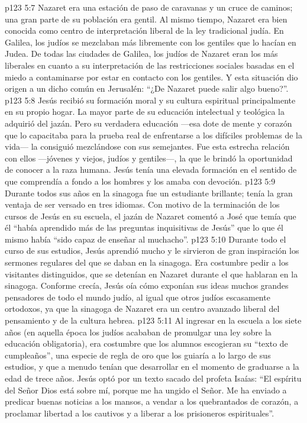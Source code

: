 \vs p123 5:7 Nazaret era una estación de paso de caravanas y un cruce de caminos; una gran parte de su población era gentil. Al mismo tiempo, Nazaret era bien conocida como centro de interpretación liberal de la ley tradicional judía. En Galilea, los judíos se mezclaban más libremente con los gentiles que lo hacían en Judea. De todas las ciudades de Galilea, los judíos de Nazaret eran los más liberales en cuanto a su interpretación de las restricciones sociales basadas en el miedo a contaminarse por estar en contacto con los gentiles. Y esta situación dio origen a un dicho común en Jerusalén: “¿De Nazaret puede salir algo bueno?”.
\vs p123 5:8 Jesús recibió su formación moral y su cultura espiritual principalmente en su propio hogar. La mayor parte de su educación intelectual y teológica la adquirió del jazán. Pero su verdadera educación ---esa dote de mente y corazón que lo capacitaba para la prueba real de enfrentarse a los difíciles problemas de la vida--- la consiguió mezclándose con sus semejantes. Fue esta estrecha relación con ellos ---jóvenes y viejos, judíos y gentiles---, la que le brindó la oportunidad de conocer a la raza humana. Jesús tenía una elevada formación en el sentido de que comprendía a fondo a los hombres y los amaba con devoción.
\vs p123 5:9 \pc Durante todos sus años en la sinagoga fue un estudiante brillante; tenía la gran ventaja de ser versado en tres idiomas. Con motivo de la terminación de los cursos de Jesús en su escuela, el jazán de Nazaret comentó a José que temía que él “había aprendido más de las preguntas inquisitivas de Jesús” que lo que él mismo había “sido capaz de enseñar al muchacho”.
\vs p123 5:10 Durante todo el curso de sus estudios, Jesús aprendió mucho y le sirvieron de gran inspiración los sermones regulares del  que se daban en la sinagoga. Era costumbre pedir a los visitantes distinguidos, que se detenían en Nazaret durante el  que hablaran en la sinagoga. Conforme crecía, Jesús oía cómo exponían sus ideas muchos grandes pensadores de todo el mundo judío, al igual que otros judíos escasamente ortodoxos, ya que la sinagoga de Nazaret era un centro avanzado liberal del pensamiento y de la cultura hebrea.
\vs p123 5:11 Al ingresar en la escuela a los siete años (en aquella época los judíos acababan de promulgar una ley sobre la educación obligatoria), era costumbre que los alumnos escogieran su “texto de cumpleaños”, una especie de regla de oro que los guiaría a lo largo de sus estudios, y que a menudo tenían que desarrollar en el momento de graduarse a la edad de trece años. Jesús optó por un texto sacado del profeta Isaías: “El espíritu del Señor Dios está sobre mí, porque me ha ungido el Señor. Me ha enviado a predicar buenas noticias a los mansos, a vendar a los quebrantados de corazón, a proclamar libertad a los cautivos y a liberar a los prisioneros espirituales”.
